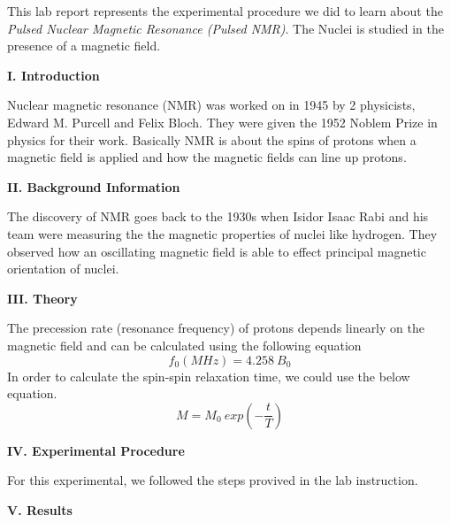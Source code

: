 \documentclass[fleqn]{article}
\begin{document}
  \vspace{10px}

  This lab report represents the experimental procedure we did to learn about the \emph{Pulsed Nuclear 
  Magnetic Resonance (Pulsed NMR)}. The Nuclei is studied in the presence of a magnetic field.

  \vspace{20px}


  \textbf{I. Introduction}

  \vspace{10px}

  Nuclear magnetic resonance (NMR) was worked on in 1945 by 2 physicists, Edward M. Purcell and Felix Bloch. They were given
  the 1952 Noblem Prize in physics for their work. \textcite{One} Basically NMR is about the spins of protons when a magnetic field 
  is applied and how the magnetic fields can line up protons.

  \vspace{20px}


  \textbf{II. Background Information}

  \vspace{10px}

  The discovery of NMR goes back to the 1930s when Isidor Isaac Rabi and his team were measuring the the magnetic properties of 
  nuclei like hydrogen. They observed how an oscillating magnetic field is able to effect principal magnetic orientation 
  of nuclei.\textcite{Two}

  \vspace{20px}


  \textbf{III. Theory}

  \vspace{10px}

  The precession rate (resonance frequency) of protons depends linearly on the magnetic field and can be calculated using the following equation
  $$
    f_0(MHz)=4.258 ~ B_0
  $$
  In order to calculate the spin-spin relaxation time, we could use the below equation.
  $$
    M=M_0 ~ exp \left(-\dfrac{t}{T}\right)
  $$


  \textbf{IV. Experimental Procedure}

  \vspace{10px}

  For this experimental, we followed the steps provived in the lab instruction. \textcite{Three}
  
  \vspace{20px}

  \textbf{V. Results}
\end{document}
